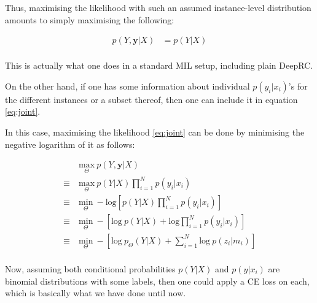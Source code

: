 \documentclass[11pt]{article}
\begin{document}
Thus, maximising the likelihood with such an assumed instance-level distribution amounts to simply maximising the following:

\begin{align*}
    p(Y,\bm{y}\vert X) &= p(Y\vert X)\\
\end{align*}

This is actually what one does in a standard MIL setup, including plain DeepRC.
\newpage

On the other hand, if one has some information about individual $p(y_i|x_i)$'s for the different instances or a subset thereof, then one can include it in equation \ref{eq:joint}.

In this case, maximising the likelihood \ref{eq:joint} can be done by minimising the negative logarithm of it as follows:


\begin{align*}
    &\underset{\Theta}{\text{max}}\ p(Y,\bm{y}\vert X) \\
    \equiv\ &\underset{\Theta}{\text{max}}\ p(Y\vert X)\prod_{i=1}^{N} p(y_i\vert x_i) \\
    \equiv\ &\underset{\Theta}{\text{min}}\ - \text{log} [p(Y\vert X)\prod_{i=1}^{N} p(y_i\vert x_i)]\\
    \equiv\ &\underset{\Theta}{\text{min}}\ - \left[\text{log}\ p(Y\vert X) + \text{log}\prod_{i=1}^{N} p(y_i\vert x_i)\right]\\
    \equiv\ &\underset{\Theta}{\text{min}}\ - \left[\text{log}\ p_\Theta(Y\vert X) + \sum_{i=1}^{N} \text{log}\ p(z_i\vert m_i)\right]\\
\end{align*}

Now, assuming both conditional probabilities $p(Y\vert X)$ and $p(y\vert x_i)$ are binomial distributions with some labels, then one could apply a CE loss on each, which is basically what we have done until now.
\end{document}
